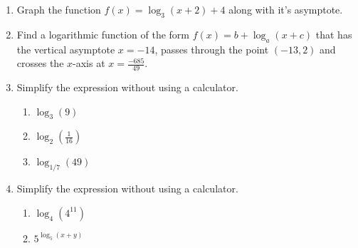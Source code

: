 \begin{enumerate}
\item Graph the function $f(x)=\log_{3}(x+2)+4$ along with it's asymptote.\\


\vfill
\item Find a logarithmic function of the form $f(x)=b+\log_{a}(x+c)$ that has the vertical asymptote $x=-14$, passes through the point $(-13, 2)$ and crosses the $x$-axis at $x=\frac{-685}{49}$.
\vfill
\vfill
\vfill

\newpage



\item Simplify the expression without using a calculator.
\begin{enumerate}

\item $\log_3(9)$\\

\item $\displaystyle \log_2(\frac{1}{16})$\\

\item $\log_{1/7}(49)$\\



\end{enumerate}







\item Simplify the expression without using a calculator.
\begin{enumerate}

\item $\displaystyle \log_4(4^{11})$\\

\item $\displaystyle 5^{\log_5(x+y)}$\\


\end{enumerate}
\end{enumerate}
